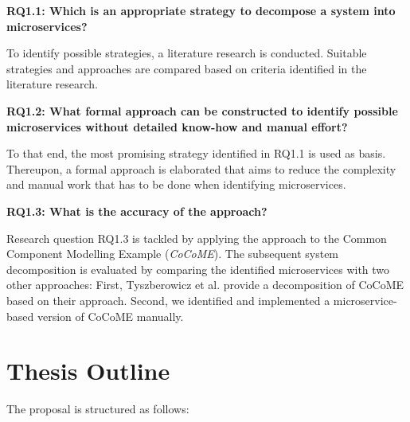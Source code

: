 \vspace{0.5cm}
\noindent
\textbf{RQ1.1: Which is an appropriate strategy to decompose a system into microservices?}

\vspace{0.5cm}
\noindent
To identify possible strategies, a literature research is conducted. Suitable strategies and approaches are compared based on criteria identified in the literature research.
\vspace{0.5cm}

\noindent
\textbf{RQ1.2: What formal approach can be constructed to identify possible microservices without detailed know-how and manual effort?}

\vspace{0.5cm}
\noindent
To that end, the most promising strategy identified in RQ1.1 is used as basis. Thereupon, a formal approach is elaborated that aims to reduce the complexity and manual work that has to be done when identifying microservices.
\vspace{0.5cm}


\noindent
\textbf{RQ1.3: What is the accuracy of the approach?   }

\vspace{0.5cm}
\noindent
Research question RQ1.3 is tackled by applying the approach to the Common Component Modelling Example (\textit{CoCoME}). The subsequent system decomposition is evaluated by comparing the identified microservices with two other approaches: First, Tyszberowicz et al. \cite{FunctionalDecompositionHeinrich} provide a decomposition of CoCoME based on their approach. Second, we identified and implemented a microservice-based version of CoCoME manually. 

\vspace{0.5cm}



\endgroup
\vspace{1cm}







\section{Thesis Outline}
\label{sec_Introduction:ThesisOutline}
The proposal is structured as follows:


